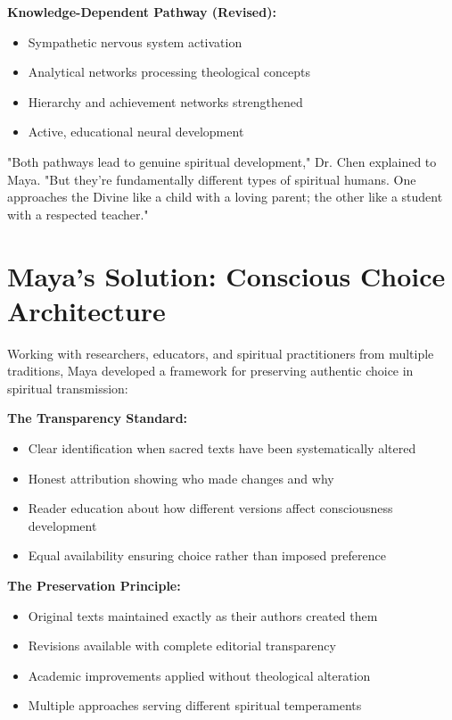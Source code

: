 \documentclass[11pt,twoside]{book}
\begin{document}
\textbf{\textbf{Knowledge-Dependent Pathway (Revised):}}
\begin{itemize}
\item Sympathetic nervous system activation
\item Analytical networks processing theological concepts
\item Hierarchy and achievement networks strengthened
\item Active, educational neural development
\end{itemize}

"Both pathways lead to genuine spiritual development," Dr. Chen explained to Maya. "But they're fundamentally different types of spiritual humans. One approaches the Divine like a child with a loving parent; the other like a student with a respected teacher."
\section*{Maya's Solution: Conscious Choice Architecture}
\label{sec:org62bfcd8}

Working with researchers, educators, and spiritual practitioners from multiple traditions, Maya developed a framework for preserving authentic choice in spiritual transmission:

\textbf{\textbf{The Transparency Standard:}}
\begin{itemize}
\item Clear identification when sacred texts have been systematically altered
\item Honest attribution showing who made changes and why
\item Reader education about how different versions affect consciousness development
\item Equal availability ensuring choice rather than imposed preference
\end{itemize}

\textbf{\textbf{The Preservation Principle:}}
\begin{itemize}
\item Original texts maintained exactly as their authors created them
\item Revisions available with complete editorial transparency
\item Academic improvements applied without theological alteration
\item Multiple approaches serving different spiritual temperaments
\end{itemize}
\end{document}
